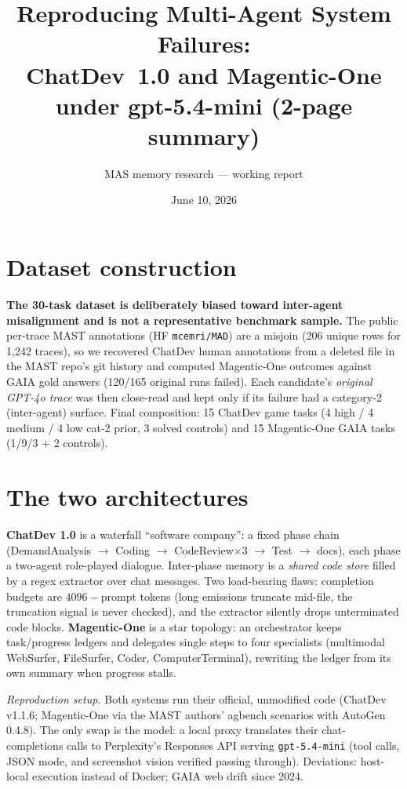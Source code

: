 \documentclass[10pt]{article}
\title{\vspace{-1.5em}Reproducing Multi-Agent System Failures:\\
ChatDev~1.0 and Magentic-One under gpt-5.4-mini \textnormal{\large (2-page summary)}\vspace{-0.5em}}
\author{MAS memory research --- working report}
\date{June 10, 2026}
\begin{document}
\maketitle
\vspace{-2.5em}

\section{Dataset construction}
\textbf{The 30-task dataset is deliberately biased toward inter-agent
misalignment and is not a representative benchmark sample.} The public
per-trace MAST annotations (HF \texttt{mcemri/MAD}) are a misjoin (206 unique
rows for 1{,}242 traces), so we recovered ChatDev human annotations from a
deleted file in the MAST repo's git history and computed Magentic-One outcomes
against GAIA gold answers (120/165 original runs failed). Each candidate's
\emph{original GPT-4o trace} was then close-read and kept only if its failure
had a category-2 (inter-agent) surface. Final composition: 15 ChatDev game
tasks (4 high / 4 medium / 4 low cat-2 prior, 3 solved controls) and 15
Magentic-One GAIA tasks (1/9/3 + 2 controls).

\section{The two architectures}
\textbf{ChatDev 1.0} is a waterfall ``software company'': a fixed phase chain
(DemandAnalysis $\rightarrow$ Coding $\rightarrow$ CodeReview$\times$3
$\rightarrow$ Test $\rightarrow$ docs), each phase a two-agent role-played
dialogue. Inter-phase memory is a \emph{shared code store} filled by a regex
extractor over chat messages. Two load-bearing flaws: completion budgets are
$4096-\mathrm{prompt}$ tokens (long emissions truncate mid-file, the
truncation signal is never checked), and the extractor silently drops
unterminated code blocks. \textbf{Magentic-One} is a star topology: an
orchestrator keeps task/progress ledgers and delegates single steps to four
specialists (multimodal WebSurfer, FileSurfer, Coder, ComputerTerminal),
rewriting the ledger from its own summary when progress stalls.

\emph{Reproduction setup.} Both systems run their official, unmodified code
(ChatDev v1.1.6; Magentic-One via the MAST authors' agbench scenarios with
AutoGen 0.4.8). The only swap is the model: a local proxy translates their
chat-completions calls to Perplexity's Responses API serving
\texttt{gpt-5.4-mini} (tool calls, JSON mode, and screenshot vision verified
passing through). Deviations: host-local execution instead of Docker; GAIA
web drift since 2024.
\end{document}
